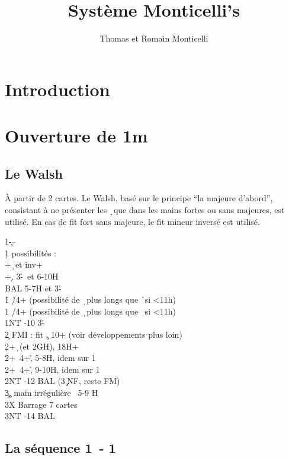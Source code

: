 \documentclass[a4paper]{article}
\title{Système Monticelli's}
\author{Thomas et Romain Monticelli}
\begin{document}
\maketitle
\tableofcontents

\section{Introduction}

\section{Ouverture de 1m}

\subsection{Le Walsh}

À partir de 2 cartes. Le Walsh, basé sur le principe ``la majeure d'abord'', consistant à ne présenter les \d\ que dans les mains fortes ou sans majeures, est utilisé.
En cas de fit fort sans majeure, le fit mineur inversé est utilisé.

\begin{bidtable}
1\c---\\
1\d {} possibilités :\\
+\d\ et inv+\\
+\d , 3-\h \s\ et 6-10H\\
\>BAL 5-7H et 3-\h \s \\
1\h \> \h /4+ (possibilité de \d\ plus longs que \h\ si <11h)\\
1\s \> \s /4+ (possibilité de \d\ plus longs que \s\ si <11h)\\
1NT -10 3-\h \s \\
2\c \> FMI : fit \c , 10+ (voir développements plus loin)\\
2\d {}+\d\ (et 2GH), 18H+\\
2\h {}+\s\ 4+\h , 5-8H, idem sur 1\d \\
2\s {}+\s\ 4+\h , 9-10H, idem sur 1\d \\
2NT	 -12 BAL (3\c\ NF, reste FM)\\
3\c	 {}\c , main irrégulière ~5-9 H\\
3X	 \> Barrage 7 cartes\\
3NT	 -14 BAL
\end{bidtable}

\subsection{La séquence 1\pdfc\ - 1\pdfd}
\end{document}
